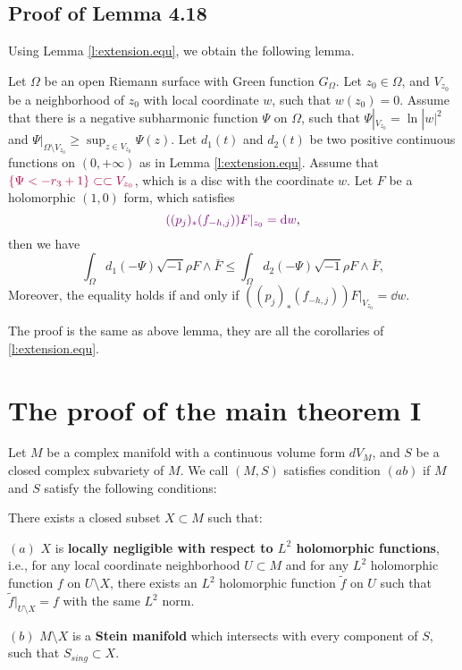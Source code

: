 \subsection{Proof of Lemma 4.18}

Using Lemma \ref{l:extension.equ}, we obtain the following lemma.

\begin{lemma} 
  { \color{violet} Let $\Omega$ be an open Riemann
surface with Green function $G_{\Omega}$.} Let $z_{0}\in\Omega$, and
$V_{z_0}$ be a neighborhood of $z_{0}$ with local coordinate $w$,
such that $w(z_{0})=0$. Assume that there is a negative subharmonic
function $\Psi$ on $\Omega$, such that $\Psi|_{V_{z_0}}=\ln|w|^{2}$
and $\Psi|_{\Omega\setminus V_{z_0}}\geq\sup_{z\in V_{z_0}}\Psi(z)$.
Let $d_{1}(t)$ and $d_{2}(t)$ be two positive continuous functions
on $(0,+\infty)$ as in Lemma \ref{l:extension.equ}. Assume that
${\color{purple}\{\Psi<-r_{3}+1\}\subset\subset V_{z_0}}$, which is a disc with the
coordinate $w$. Let $F$ be a holomorphic $(1,0)$ form, which
satisfies $${ \color{violet} ((p_{j})_{*}(f_{-h,j}))F|_{z_{0}}=\dd w},$$ then we have
$$\int_{\Omega}d_{1}(-\Psi)\sqrt{-1}\rho F\wedge\bar{F}\leq\int_{\Omega}d_{2}(-\Psi)\sqrt{-1}\rho F\wedge\bar{F},$$
Moreover, the equality holds if and only if $((p_{j})_{*}(f_{-h,j}))F|_{V_{z_0}}=\dd w$.
\end{lemma}
The proof is the same as above lemma, they are all the corollaries of \ref{l:extension.equ}.

\section{The proof of the main theorem I}
  
\begin{definition}
  Let $M$ be a complex manifold with a continuous volume form
  $dV_{M}$, and $S$ be a closed complex subvariety of $M$. We call
  $(M,S)$ satisfies condition $(ab)$ if $M$ and $S$ satisfy the
  following conditions:
  
  There exists a closed subset $X\subset M$ such that:
  
  $(a)$ $X$ is \textbf{locally negligible with respect to $L^2$ holomorphic
  functions}, i.e., for any local coordinate neighborhood $U\subset M$
  and for any $L^2$ holomorphic function $f$ on $U\setminus X$, there
  exists an $L^2$ holomorphic function $\tilde{f}$ on $U$ such that
  $\tilde{f}|_{U\setminus X}=f$ with the same $L^{2}$ norm.
  
  $(b)$ $M\setminus X$ is a \textbf{Stein manifold} which intersects with every component of $S$,
  such that $S_{sing}\subset X$.
  \end{definition}
  
